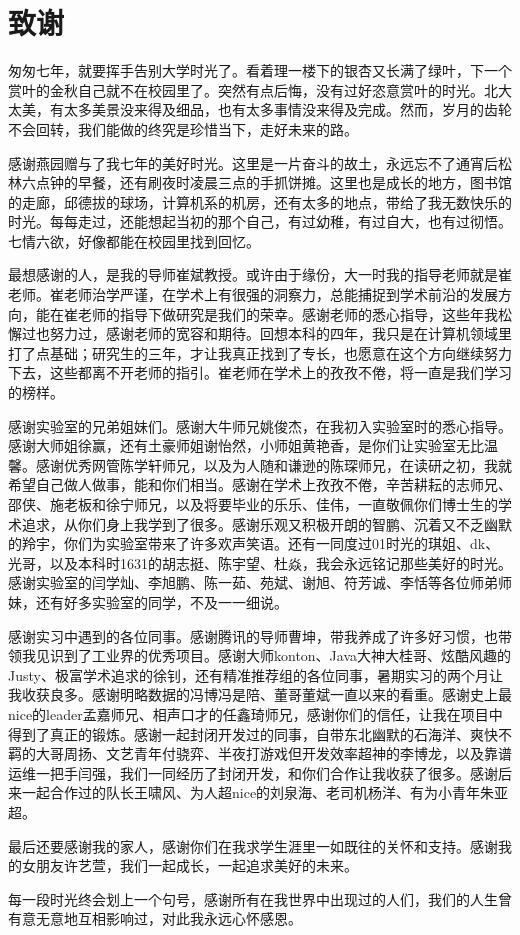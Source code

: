 
\chapter{致谢}

匆匆七年，就要挥手告别大学时光了。看着理一楼下的银杏又长满了绿叶，下一个赏叶的金秋自己就不在校园里了。突然有点后悔，没有过好恣意赏叶的时光。北大太美，有太多美景没来得及细品，也有太多事情没来得及完成。然而，岁月的齿轮不会回转，我们能做的终究是珍惜当下，走好未来的路。

感谢燕园赠与了我七年的美好时光。这里是一片奋斗的故土，永远忘不了通宵后松林六点钟的早餐，还有刷夜时凌晨三点的手抓饼摊。这里也是成长的地方，图书馆的走廊，邱德拔的球场，计算机系的机房，还有太多的地点，带给了我无数快乐的时光。每每走过，还能想起当初的那个自己，有过幼稚，有过自大，也有过彻悟。七情六欲，好像都能在校园里找到回忆。

最想感谢的人，是我的导师崔斌教授。或许由于缘份，大一时我的指导老师就是崔老师。崔老师治学严谨，在学术上有很强的洞察力，总能捕捉到学术前沿的发展方向，能在崔老师的指导下做研究是我们的荣幸。感谢老师的悉心指导，这些年我松懈过也努力过，感谢老师的宽容和期待。回想本科的四年，我只是在计算机领域里打了点基础；研究生的三年，才让我真正找到了专长，也愿意在这个方向继续努力下去，这些都离不开老师的指引。崔老师在学术上的孜孜不倦，将一直是我们学习的榜样。

感谢实验室的兄弟姐妹们。感谢大牛师兄姚俊杰，在我初入实验室时的悉心指导。感谢大师姐徐赢，还有土豪师姐谢怡然，小师姐黄艳香，是你们让实验室无比温馨。感谢优秀网管陈学轩师兄，以及为人随和谦逊的陈琛师兄，在读研之初，我就希望自己做人做事，能和你们相当。感谢在学术上孜孜不倦，辛苦耕耘的志师兄、邵侠、施老板和徐宁师兄，以及将要毕业的乐乐、佳伟，一直敬佩你们博士生的学术追求，从你们身上我学到了很多。感谢乐观又积极开朗的智鹏、沉着又不乏幽默的羚宇，你们为实验室带来了许多欢声笑语。还有一同度过01时光的琪姐、dk、光哥，以及本科时1631的胡志挺、陈宇望、杜焱，我会永远铭记那些美好的时光。感谢实验室的闫学灿、李旭鹏、陈一茹、苑斌、谢旭、符芳诚、李恬等各位师弟师妹，还有好多实验室的同学，不及一一细说。

感谢实习中遇到的各位同事。感谢腾讯的导师曹坤，带我养成了许多好习惯，也带领我见识到了工业界的优秀项目。感谢大师konton、Java大神大桂哥、炫酷风趣的Justy、极富学术追求的徐钊，还有精准推荐组的各位同事，暑期实习的两个月让我收获良多。感谢明略数据的冯博冯是陪、董哥董斌一直以来的看重。感谢史上最nice的leader孟嘉师兄、相声口才的任鑫琦师兄，感谢你们的信任，让我在项目中得到了真正的锻炼。感谢一起封闭开发过的同事，自带东北幽默的石海洋、爽快不羁的大哥周扬、文艺青年付骁弈、半夜打游戏但开发效率超神的李博龙，以及靠谱运维一把手闫强，我们一同经历了封闭开发，和你们合作让我收获了很多。感谢后来一起合作过的队长王啸风、为人超nice的刘泉海、老司机杨洋、有为小青年朱亚超。


最后还要感谢我的家人，感谢你们在我求学生涯里一如既往的关怀和支持。感谢我的女朋友许艺萱，我们一起成长，一起追求美好的未来。

每一段时光终会划上一个句号，感谢所有在我世界中出现过的人们，我们的人生曾有意无意地互相影响过，对此我永远心怀感恩。

